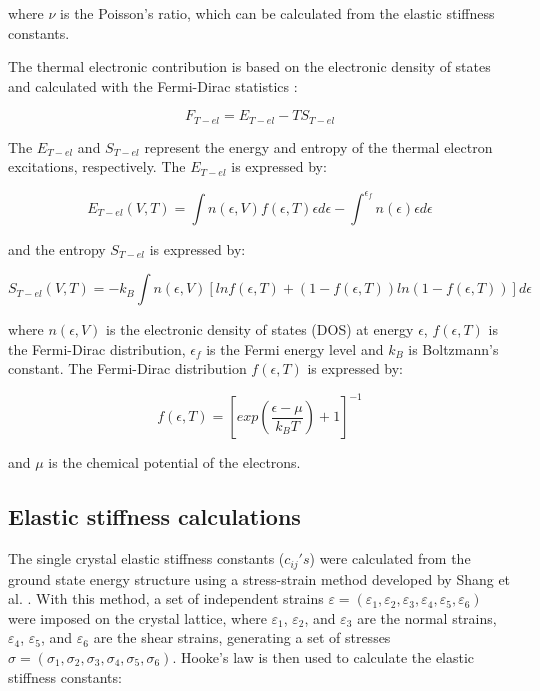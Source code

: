 \noindent where $\nu$ is the Poisson's ratio, which can be calculated from the elastic stiffness constants.

The thermal electronic contribution is based on the electronic density of states and calculated with the Fermi-Dirac statistics \cite{Shang2010,Wang2004}:

\begin{equation}
\label{eq:thermalelectronic}
F_{T-el} = E_{T-el} - T S_{T-el}
\end{equation}

\noindent The $E_{T-el}$ and $S_{T-el}$ represent the energy and entropy of the thermal electron excitations, respectively. The $E_{T-el}$ is expressed by:

\begin{equation}
\label{eq:etel}
E_{T-el} (V,T) = \int n\left(\epsilon, V\right) f \left(\epsilon, T\right) \epsilon d \epsilon - \int^{\epsilon_{f}} n (\epsilon) \epsilon d \epsilon
\end{equation}

\noindent and the entropy $S_{T-el}$ is expressed by:

\begin{equation}
\label{eq:sel}
S_{T-el} (V,T) = -k_{B} \int n(\epsilon, V) \left[ ln f \left(\epsilon,T\right) + \left( 1 - f(\epsilon, T) \right) ln \left( 1 - f \left(\epsilon, T \right) \right) \right] d\epsilon 
\end{equation}

\noindent where $n(\epsilon, V)$ is the electronic density of states (DOS) at energy $\epsilon$,  $f (\epsilon,T)$ is the Fermi-Dirac distribution, $\epsilon_{f}$ is the Fermi energy level and $k_{B}$ is Boltzmann's constant. The Fermi-Dirac distribution $f (\epsilon, T)$ is expressed by:

\begin{equation}
\label{eq:fermidirac}
f (\epsilon,T) = \left[ exp \left( \frac{\epsilon - \mu}{k_{B} T} \right) + 1 \right]^{-1}
\end{equation}

\noindent and $\mu$ is the chemical potential of the electrons. 


\subsection{Elastic stiffness calculations}

The single crystal elastic stiffness constants ($c_{ij}$$'s$) were calculated from the ground state energy structure using a stress-strain method developed by Shang et al. \cite{Shang2007c}. With this method, a set of independent strains $\varepsilon = (\varepsilon_{1}, \varepsilon_{2}, \varepsilon_{3}, \varepsilon_{4}, \varepsilon_{5}, \varepsilon_{6})$ were imposed on the crystal lattice, where $\varepsilon_{1}$, $\varepsilon_{2}$, and $\varepsilon_{3}$ are the normal strains, $\varepsilon_{4}$, $\varepsilon_{5}$, and $\varepsilon_{6}$ are the shear strains, generating a set of stresses $\sigma = (\sigma_{1}, \sigma_{2}, \sigma_{3}, \sigma_{4}, \sigma_{5},\sigma_{6})$. Hooke's law is then used to calculate the elastic stiffness constants: 

